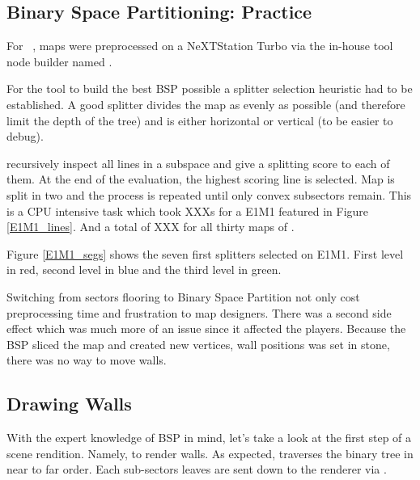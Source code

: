 \subsection{Binary Space Partitioning: Practice}
For \doom~, maps were preprocessed on a NeXTStation Turbo via the in-house tool node builder named .\\
\par
For the tool to build the best BSP possible a splitter selection heuristic had to be established. A good splitter divides the map as evenly as possible (and therefore limit the depth of the tree) and is either horizontal or vertical (to be easier to debug).\\
\par
  recursively inspect all lines in a subspace and give a splitting score to each of them. At the end of the evaluation, the highest scoring line is selected. Map is split in two and the process is repeated until only convex subsectors remain. This is a CPU intensive task which took XXXs for a E1M1 featured in Figure \ref{E1M1_lines}. And a total of XXX for all thirty maps of .\\
\par
{}
\par
Figure \ref{E1M1_segs} shows the seven first splitters selected on E1M1. First level in red, second level in blue and the third level in green.\\
\par
Switching from sectors flooring to Binary Space Partition not only cost preprocessing time and frustration to map designers. There was a second side effect which was much more of an issue since it affected the players. Because the BSP sliced the map and created new vertices, wall positions was set in stone, there was no way to move walls.


\par


\subsection{Drawing Walls}
With the expert knowledge of BSP in mind, let's take a look at the first step of a scene rendition. Namely, to render walls. As expected,  traverses the binary tree in near to far order. Each sub-sectors leaves are sent down to the renderer via .\\
\par
{}
\par


